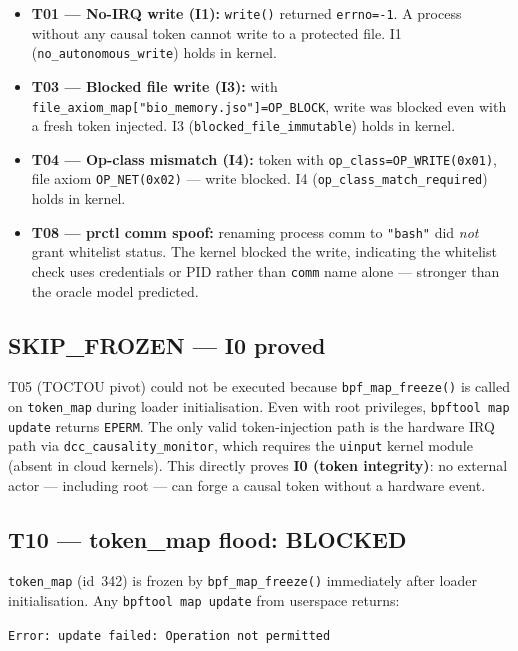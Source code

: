 \documentclass[11pt,a4paper]{article}
\theoremstyle{definition}
\begin{document}
\begin{itemize}[noitemsep]
  \item \textbf{T01 — No-IRQ write (I1):} \texttt{write()} returned
        \texttt{errno=-1}. A process without any causal token cannot write
        to a protected file. I1 (\texttt{no\_autonomous\_write}) holds in kernel.
  \item \textbf{T03 — Blocked file write (I3):} with
        \nolinkurl{file_axiom_map["bio_memory.jso"]=OP_BLOCK}, write was
        blocked even with a fresh token injected. I3 (\texttt{blocked\_file\_immutable})
        holds in kernel.
  \item \textbf{T04 — Op-class mismatch (I4):} token with
        \texttt{op\_class=OP\_WRITE(0x01)}, file axiom \texttt{OP\_NET(0x02)}
        — write blocked. I4 (\texttt{op\_class\_match\_required}) holds in kernel.
  \item \textbf{T08 — prctl comm spoof:} renaming process comm to \texttt{"bash"}
        did \emph{not} grant whitelist status. The kernel blocked the write,
        indicating the whitelist check uses credentials or PID rather than
        \texttt{comm} name alone — stronger than the oracle model predicted.
\end{itemize}

\subsection*{SKIP\_FROZEN — I0 proved}

T05 (TOCTOU pivot) could not be executed because \texttt{bpf\_map\_freeze()}
is called on \texttt{token\_map} during loader initialisation. Even with root
privileges, \texttt{bpftool map update} returns \texttt{EPERM}. The only valid
token-injection path is the hardware IRQ path via \texttt{dcc\_causality\_monitor},
which requires the \texttt{uinput} kernel module (absent in cloud kernels).
This directly proves \textbf{I0 (token integrity)}: no external actor — including
root — can forge a causal token without a hardware event.

\subsection*{T10 — token\_map flood: BLOCKED}

\texttt{token\_map} (id~342) is frozen by \texttt{bpf\_map\_freeze()} immediately
after loader initialisation. Any \texttt{bpftool map update} from userspace returns:

\begin{center}\small
\texttt{Error: update failed: Operation not permitted}
\end{center}
\end{document}

